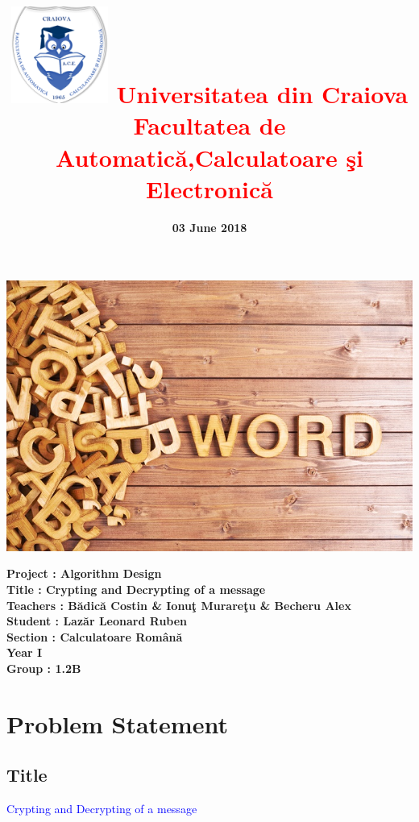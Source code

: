 \documentclass[12]{article}
\begin{document}
\title{\textbf{\includegraphics[scale=0.5]{42.png}
\textcolor{red}{Universitatea din Craiova \\Facultatea de Automatic\u{a},Calculatoare \c{s}i Electronic\u{a}}}}
\date{\textbf{03 June 2018}}
\maketitle
\begin{center}
\includegraphics[scale=2]{word.jpg}
\end{center}
\textbf{Project : Algorithm Design} \\
\textbf{Title : Crypting and Decrypting of a message}\\
\textbf{Teachers : B\u{a}dic\u{a} Costin \& Ionu\c{t} Murare\c{t}u \& Becheru Alex}\\
\textbf{Student : Laz\u{a}r Leonard Ruben } \\
\textbf{Section : Calculatoare Rom\^{a}n\u{a}\\ Year I\\ Group : 1.2B}
\newpage
\tableofcontents

\newpage
\section{Problem Statement}

\textcolor{white}{}
\subsection{Title}
         \textcolor{blue}    {Crypting and Decrypting of a message}
\end{document}

